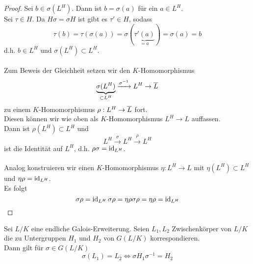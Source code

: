 \begin{proof}
		Sei $b\in\sigma(L^H)$. Dann ist $b=\sigma(a)$ für ein $a\in L^H$.\\
		Sei $\tau\in H$. Da $H\sigma=\sigma H$ ist gibt es $\tau'\in H$, sodass
		\[\tau(b)=\tau(\sigma(a))=\sigma(\underbrace{\tau'(a)}_{=a})=\sigma(a)=b\]
		d.h. $b\in L^H$ und $\sigma(L^H)\subset L^H$.\\
		\\
		Zum Beweis der Gleichheit setzen wir den $K$-Homomorphismus
		\[\underbrace{\sigma(L^H)}_{\subset L^H}\xrightarrow{\sigma^{-1}}L^H\to\overline{L}\]
		zu einem $K$-Homomorphismus $\rho:L^H\to\overline{L}$ fort.\\
		Diesen können wir wie oben als $K$-Homomorphismus $L^H\to L$ auffassen.\\
		Dann ist $\rho(L^H)\subset L^H$ und
		\[L^H\xrightarrow{\sigma}L^H\xrightarrow{\rho}L^H\]
		ist die Identität auf $L^H$, d.h. $\rho\sigma=\operatorname{id}_{L^H}$.\\
		\\
		Analog konstruieren wir einen $K$-Homomorphismus $\eta:L^H\to L$ mit $\eta(L^H)\subset L^H$ und $\eta\rho=\operatorname{id}_{L^H}$.\\
		Es folgt
		\[\sigma\rho=\operatorname{id}_{L^H}\sigma\rho=\eta\rho\sigma\rho=\eta\rho=\operatorname{id}_{L^H}\]
	\end{proof}

	\begin{satz}
		Sei $L/K$ eine endliche Galois-Erweiterung. Seien $L_1,L_2$ Zwischenkörper von $L/K$ die zu Untergruppen $H_1$ und $H_2$ von $G(L/K)$ korrespondieren.\\
		Dann gilt für $\sigma\in G(L/K)$
		\[\sigma(L_1)=L_2\Leftrightarrow\sigma H_1\sigma^{-1}=H_2\]
	\end{satz}


